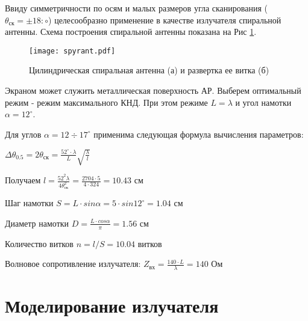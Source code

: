 Ввиду симметричности по осям и малых размеров угла сканирования ($\theta_\text{ск}=\pm18:\circ$) целесообразно применение в качестве излучателя спиральной антенны. Схема построения спиральной антенны показана на Рис \ref{fig:spyrant}. 

\begin{figure}[H]
	\centering
	\texttt{[image: spyrant.pdf]}
	\caption{Цилиндрическая спиральная антенна (а) и развертка ее витка (б)}
	\label{fig:spyrant}
\end{figure}

Экраном может служить металлическая поверхность АР. Выберем оптимальный режим - режим максимального КНД. При этом режиме $L=\lambda$ и угол намотки $\alpha=12^\circ$.

Для углов $\alpha=12\div17^\circ$ применима следующая формула вычисления параметров:

$\displaystyle \Delta\theta_{0.5}=2\theta_\text{ск}=\frac{52^\circ\cdot\lambda}{L}\sqrt{\frac{\lambda}{l}}$

Получаем $\displaystyle l=\frac{52^2\lambda}{4\theta^2_\text{ск}}=\frac{2704\cdot5}{4\cdot324}=10.43 \text{ см}$

Шаг намотки $\displaystyle S=L\cdot sin\alpha=5\cdot sin12^\circ=1.04 \text{ см}$

Диаметр намотки $\displaystyle D=\frac{L\cdot cos\alpha}{\pi}=1.56 \text{ см}$

Количество витков $\displaystyle n=l/S=10.04 \text{ витков}$

Волновое сопротивление излучателя: $\displaystyle Z_\text{вх}=\frac{140\cdot L}{\lambda}=140 \text{ Ом}$

\newpage
\section{Моделирование излучателя}